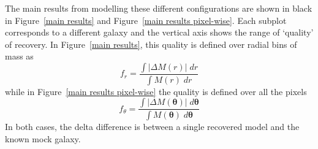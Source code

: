 \documentclass[galley,usenatbib]{mn2e}
\newcommand{\M}{\ensuremath{\mathscr{M}}}
\newcommand{\figref}[1] {Figure~\ref{#1}}
\renewcommand{\vec}[1]{\ensuremath{\boldsymbol{#1}}}
\begin{document}
The main results from modelling these different configurations are shown in black in
\figref{main results} and \figref{main results pixel-wise}. Each subplot corresponds to a different galaxy and
the vertical axis shows the range of `quality' of recovery. In \figref{main results}, this quality is
defined over radial bins of mass as
%
\begin{equation} \label{badness}
  f_r = \frac {\int \left|\Delta M(r)\right|\; dr } {\int M(r)\; dr}
\end{equation}
%
while in \figref{main results pixel-wise} the quality is defined over all the pixels
%
\begin{equation} \label{badness}
f_\theta = \frac
       {\int \left|\Delta M(\vec\theta)\right| \; d \vec{\theta} }
       {\int M(\vec\theta) \; d \vec\theta}
\end{equation}
In both cases, the delta difference is between a single recovered model and the known mock galaxy.
\end{document}
